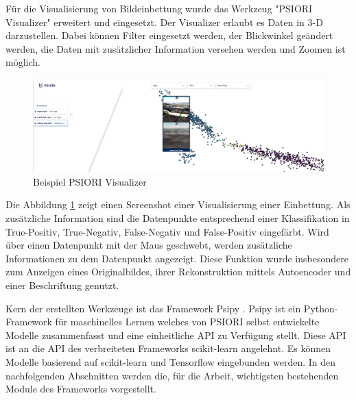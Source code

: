 	Für die Visualisierung von Bildeinbettung wurde das Werkzeug "PSIORI Visualizer" erweitert und eingesetzt. Der Visualizer erlaubt es Daten in 3-D darzustellen. Dabei können Filter eingesetzt werden, der Blickwinkel geändert werden, die Daten mit zusätzlicher Information versehen werden und Zoomen ist möglich.
	
	\begin{figure}[h]
		\centering
		\includegraphics[width=1\textwidth, center]{bilder/Grundlagen/Example_Visualizer.png}
		\caption[Beispiel PSIORI Visualizer]{Beispiel PSIORI Visualizer}
		\label{img:ExampleVisualizer}
	\end{figure}  
	Die Abbildung \ref{img:ExampleVisualizer} zeigt einen Screenshot einer Visualisierung einer Einbettung. Als zusätzliche Information sind die Datenpunkte entsprechend einer Klassifikation in True-Positiv, True-Negativ, False-Negativ und False-Positiv eingefärbt. Wird über einen Datenpunkt mit der Maus geschwebt, werden zusätzliche Informationen zu dem Datenpunkt angezeigt. Diese Funktion wurde insbesondere zum Anzeigen eines Originalbildes, ihrer Rekonstruktion mittels Autoencoder und einer Beschriftung genutzt. 
	
	Kern der erstellten Werkzeuge ist das Framework  Psipy \cite{PSIORIGmbH.2019}. Psipy ist ein Python-Framework für maschinelles Lernen welches von PSIORI selbst entwickelte Modelle zusammenfasst und eine einheitliche API zu Verfügung stellt. Diese API ist an die API des verbreiteten Frameworks scikit-learn angelehnt. Es können Modelle basierend auf scikit-learn  und Tensorflow eingebunden werden. In den nachfolgenden Abschnitten werden die, für die Arbeit, wichtigsten bestehenden Module des Frameworks vorgestellt.
	
